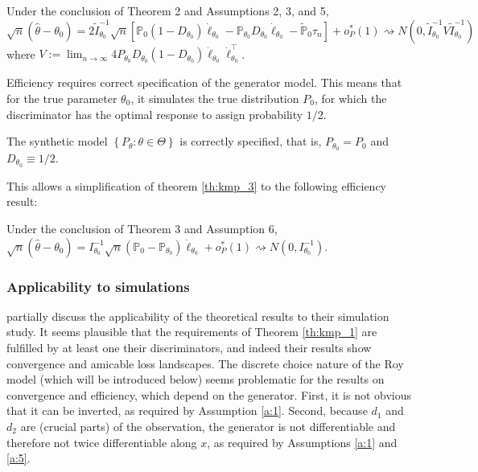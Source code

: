 \begin{theorem}
    \label{th:kmp_3}
    Under the conclusion of Theorem 2 and Assumptions 2, 3, and 5,
    \begin{equation}
        \sqrt{n}\left(\hat{\theta}-\theta_{0}\right)=2 \tilde{I}_{\theta_{0}}^{-1} \sqrt{n}\left[\mathbb{P}_{0}\left(1-D_{\theta_{0}}\right) \dot{\ell}_{\theta_{0}}-\mathbb{P}_{\theta_{0}} D_{\theta_{0}} \dot{\ell}_{\theta_{0}}-\tilde{\mathbb{P}}_{0} \tau_{n}\right]+o_{P}^{*}(1) \rightsquigarrow N\left(0, \tilde{I}_{\theta_{0}}^{-1} V \tilde{I}_{\theta_{0}}^{-1}\right)
    \end{equation}
    where $V:=\lim _{n \rightarrow \infty} 4 P_{\theta_{0}} D_{\theta_{0}}\left(1-D_{\theta_{0}}\right) \dot{\ell}_{\theta_{0}} \dot{\ell}_{\theta_{0}}^{\top}$.\\
\end{theorem}

Efficiency requires correct specification of the generator model.
This means that for the true parameter $\theta_0$, it simulates the true distribution $P_0$, for which the discriminator has the optimal response to assign probability $1/2$. %

\begin{assumption}[A6, KMP]
    The synthetic model $\left\{P_{\theta}: \theta \in \Theta\right\}$ is correctly specified, that is, $P_{\theta_{0}}=P_{0}$ and $D_{\theta_{0}} \equiv 1 / 2$.
\end{assumption}

This allows a simplification of theorem \ref{th:kmp_3} to the following efficiency result:

\begin{theorem}
    Under the conclusion of Theorem 3 and Assumption 6, $\sqrt{n}\left(\hat{\theta}-\theta_{0}\right)=I_{\theta_{0}}^{-1} \sqrt{n}\left(\mathbb{P}_{0}-\mathbb{P}_{\theta_{0}}\right) \dot{\ell}_{\theta_{0}}+o_{P}^{*}(1) \rightsquigarrow N\left(0, I_{\theta_{0}}^{-1}\right)$.
\end{theorem}

\subsubsection{Applicability to simulations}
\label{sec:theoerem_simulation}

\textcite{kaji2023adversarial} partially discuss the applicability of the theoretical results to their simulation study.
It seems plausible that the requirements of Theorem \ref{th:kmp_1} are fulfilled by at least one their discriminators, and indeed their results show convergence and amicable loss landscapes.
The discrete choice nature of the Roy model (which will be introduced below) seems problematic for the results on convergence and efficiency, which depend on the generator. %
First, it is not obvious that it can be inverted, as required by Assumption \ref{a:1}.
Second, because $d_1$ and $d_2$ are (crucial parts) of the observation, the generator is not differentiable and therefore not twice differentiable along $x$, as required by Assumptions \ref{a:1} and \ref{a:5}.

